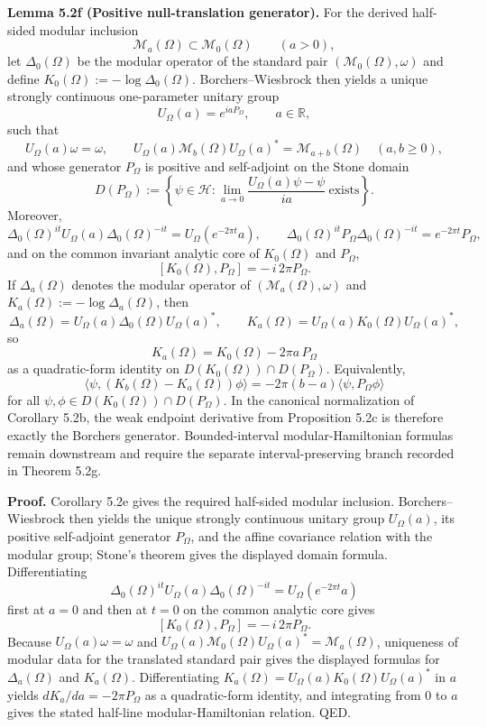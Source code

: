 \textbf{Lemma 5.2f (Positive null-translation generator).} For the derived half-sided modular inclusion
\[
\mathcal M_a(\Omega)\subset \mathcal M_0(\Omega)
\qquad (a>0),
\]
let \(\Delta_0(\Omega)\) be the modular operator of the standard pair \((\mathcal M_0(\Omega),\omega)\) and define \(K_0(\Omega):=-\log \Delta_0(\Omega)\). Borchers--Wiesbrock then yields a unique strongly continuous one-parameter unitary group
\[
U_\Omega(a)=e^{iaP_\Omega},
\qquad a\in\mathbb R,
\]
such that
\[
U_\Omega(a)\omega=\omega,
\qquad
U_\Omega(a)\mathcal M_b(\Omega)U_\Omega(a)^*=\mathcal M_{a+b}(\Omega)
\quad (a,b\ge0),
\]
and whose generator \(P_\Omega\) is positive and self-adjoint on the Stone domain
\[
D(P_\Omega)
:=
\left\{
\psi\in\mathcal H:
\lim_{a\to0}\frac{U_\Omega(a)\psi-\psi}{ia}\ \text{exists}
\right\}.
\]
Moreover,
\[
\Delta_0(\Omega)^{it}U_\Omega(a)\Delta_0(\Omega)^{-it}
=
U_\Omega(e^{-2\pi t}a),
\qquad
\Delta_0(\Omega)^{it}P_\Omega\Delta_0(\Omega)^{-it}
=
e^{-2\pi t}P_\Omega,
\]
and on the common invariant analytic core of \(K_0(\Omega)\) and \(P_\Omega\),
\[
[K_0(\Omega),P_\Omega]=-\,i\,2\pi P_\Omega.
\]
If \(\Delta_a(\Omega)\) denotes the modular operator of \((\mathcal M_a(\Omega),\omega)\) and \(K_a(\Omega):=-\log \Delta_a(\Omega)\), then
\[
\Delta_a(\Omega)=U_\Omega(a)\Delta_0(\Omega)U_\Omega(a)^*,
\qquad
K_a(\Omega)=U_\Omega(a)K_0(\Omega)U_\Omega(a)^*,
\]
so
\[
K_a(\Omega)=K_0(\Omega)-2\pi a\,P_\Omega
\]
as a quadratic-form identity on \(D(K_0(\Omega))\cap D(P_\Omega)\). Equivalently,
\[
\langle\psi,(K_b(\Omega)-K_a(\Omega))\phi\rangle
=
-2\pi(b-a)\langle\psi,P_\Omega\phi\rangle
\]
for all \(\psi,\phi\in D(K_0(\Omega))\cap D(P_\Omega)\). In the canonical normalization of Corollary 5.2b, the weak endpoint derivative from Proposition 5.2c is therefore exactly the Borchers generator. Bounded-interval modular-Hamiltonian formulas remain downstream and require the separate interval-preserving branch recorded in Theorem 5.2g.

\textbf{Proof.} Corollary 5.2e gives the required half-sided modular inclusion. Borchers--Wiesbrock then yields the unique strongly continuous unitary group \(U_\Omega(a)\), its positive self-adjoint generator \(P_\Omega\), and the affine covariance relation with the modular group; Stone's theorem gives the displayed domain formula. Differentiating
\[
\Delta_0(\Omega)^{it}U_\Omega(a)\Delta_0(\Omega)^{-it}
=
U_\Omega(e^{-2\pi t}a)
\]
first at \(a=0\) and then at \(t=0\) on the common analytic core gives
\[
[K_0(\Omega),P_\Omega]=-\,i\,2\pi P_\Omega.
\]
Because \(U_\Omega(a)\omega=\omega\) and \(U_\Omega(a)\mathcal M_0(\Omega)U_\Omega(a)^*=\mathcal M_a(\Omega)\), uniqueness of modular data for the translated standard pair gives the displayed formulas for \(\Delta_a(\Omega)\) and \(K_a(\Omega)\). Differentiating \(K_a(\Omega)=U_\Omega(a)K_0(\Omega)U_\Omega(a)^*\) in \(a\) yields \(dK_a/da=-2\pi P_\Omega\) as a quadratic-form identity, and integrating from \(0\) to \(a\) gives the stated half-line modular-Hamiltonian relation. QED.

